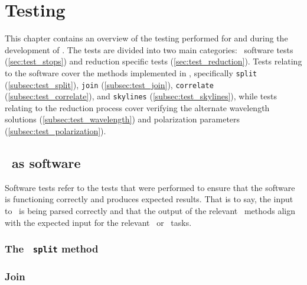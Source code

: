 \chapter{Testing}

This chapter contains an overview of the testing performed for and during the development of \stops. The tests are divided into two main categories: \stops\ software tests (\autoref{sec:test_stops}) and reduction specific tests (\autoref{sec:test_reduction}). Tests relating to the software cover the methods implemented in \stops, specifically \texttt{split} (\autoref{subsec:test_split}), \texttt{join} (\autoref{subsec:test_join}), \texttt{correlate} (\autoref{subsec:test_correlate}), and \texttt{skylines} (\autoref{subsec:test_skylines}), while tests relating to the reduction process cover verifying the alternate wavelength solutions (\autoref{subsec:test_wavelength}) and polarization parameters (\autoref{subsec:test_polarization}).

\section{\stops\ as software} \label{sec:test_stops}

Software tests refer to the tests that were performed to ensure that the software is functioning correctly and produces expected results. That is to say, the input to \stops\ is being parsed correctly and that the output of the relevant \stops\ methods align with the expected input for the relevant \iraf\ or \polsalt\ tasks.



\subsection{The \stops\ \texttt{split} method} \label{subsec:test_split}


\subsection{Join} \label{subsec:test_join}


